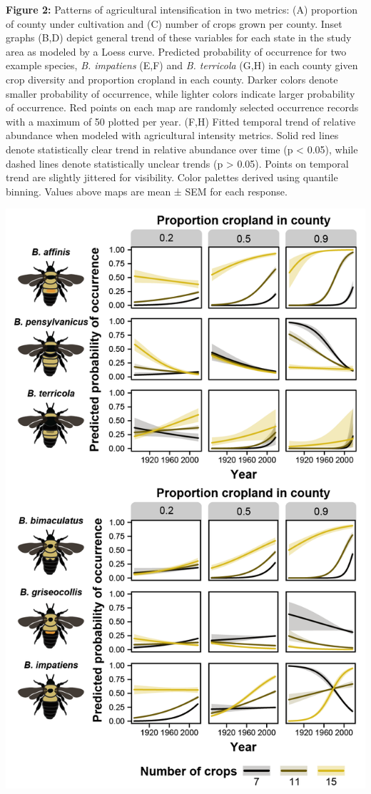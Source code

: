\documentclass[11pt,]{article}
\begin{document}
\textbf{Figure 2:} Patterns of agricultural intensification in two
metrics: (A) proportion of county under cultivation and (C) number of
crops grown per county. Inset graphs (B,D) depict general trend of these
variables for each state in the study area as modeled by a Loess curve.
Predicted probability of occurrence for two example species, \emph{B.
impatiens} (E,F) and \emph{B. terricola} (G,H) in each county given crop
diversity and proportion cropland in each county. Darker colors denote
smaller probability of occurrence, while lighter colors indicate larger
probability of occurrence. Red points on each map are randomly selected
occurrence records with a maximum of 50 plotted per year. (F,H) Fitted
temporal trend of relative abundance when modeled with agricultural
intensity metrics. Solid red lines denote statistically clear trend in
relative abundance over time (p \textless{} 0.05), while dashed lines
denote statistically unclear trends (p \textgreater{} 0.05). Points on
temporal trend are slightly jittered for visibility. Color palettes
derived using quantile binning. Values above maps are mean ± SEM for
each response.

\clearpage

\newpage

\includegraphics[width=1\textwidth,height=\textheight]{../ms_figs/fig3.png}
\end{document}
